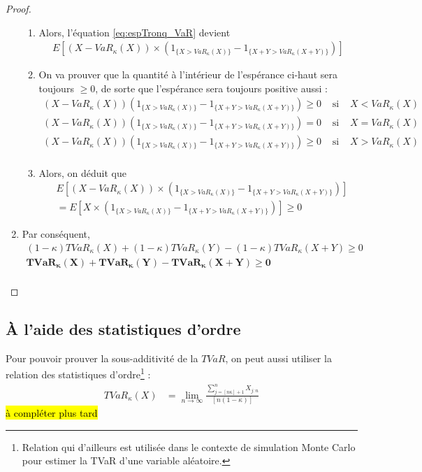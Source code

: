 \begin{proof}
\begin{enumerate}[label=(\arabic*)]
\begin{enumerate}[label=(2.\arabic*)]
\item Alors, l'équation \eqref{eq:espTronq_VaR} devient
\begin{align*}
E[(X - VaR_\kappa(X)) \times (1_{\{X > VaR_\kappa(X) \}} - 1_{\{X+Y > VaR_\kappa(X+Y) \}})]
\end{align*}
\item On va prouver que la quantité à l'intérieur de l'espérance ci-haut sera toujours $\ge 0$, de sorte que l'espérance sera toujours positive aussi : 
\begin{align*}
(X - VaR_\kappa(X))(1_{\{X > VaR_\kappa(X) \}} - 1_{\{X+Y > VaR_\kappa(X+Y) \}}) \ge 0 & \text{ si } & X < VaR_\kappa(X) \\
(X - VaR_\kappa(X))(1_{\{X > VaR_\kappa(X) \}} - 1_{\{X+Y > VaR_\kappa(X+Y) \}}) = 0 & \text{ si } & X = VaR_\kappa(X) \\
(X - VaR_\kappa(X))(1_{\{X > VaR_\kappa(X) \}} - 1_{\{X+Y > VaR_\kappa(X+Y) \}}) \ge 0 & \text{ si } & X > VaR_\kappa(X) \\
\end{align*}
\item Alors, on déduit que 
\begin{align*}
& E[(X - VaR_\kappa(X)) \times (1_{\{X > VaR_\kappa(X) \}} - 1_{\{X+Y > VaR_\kappa(X+Y) \}})] \\
& = E[X \times (1_{\{X > VaR_\kappa(X) \}} - 1_{\{X+Y > VaR_\kappa(X+Y) \}})] \ge 0
\end{align*}
\end{enumerate} %
\item Par conséquent,
\begin{align*}
(1 - \kappa)TVaR_\kappa(X) + (1 - \kappa)TVaR_\kappa(Y)- (1 - \kappa)TVaR_\kappa(X + Y) \ge 0 \\
\mathbf{TVaR_\kappa(X) + TVaR_\kappa(Y)- TVaR_\kappa(X + Y) \ge 0} \\
\end{align*}
\end{enumerate} %
\end{proof}



\subsection{À l'aide des statistiques d'ordre}
Pour pouvoir prouver la sous-additivité de la $TVaR$, on peut aussi utiliser la relation des statistiques d'ordre\footnote{Relation qui d'ailleurs est utilisée dans le contexte de simulation Monte Carlo pour estimer la TVaR d'une variable aléatoire.} : 
\begin{align*}
TVaR_\kappa(X)	& = \lim_{n \to \infty} \frac{\sum_{j= [ n \kappa ] + 1}^{n} X_{j:n}}{[n (1-\kappa)]}
\end{align*}
\hl{à compléter plus tard}





